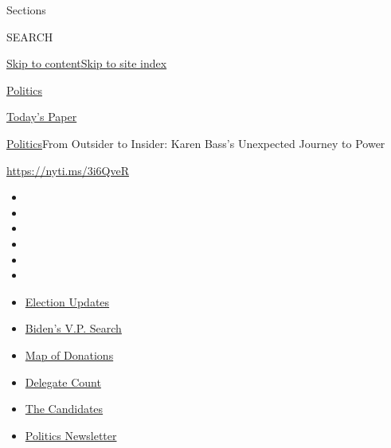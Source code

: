 Sections

SEARCH

\protect\hyperlink{site-content}{Skip to
content}\protect\hyperlink{site-index}{Skip to site index}

\href{https://www.nytimes3xbfgragh.onion/section/politics}{Politics}

\href{https://myaccount.nytimes3xbfgragh.onion/auth/login?response_type=cookie\&client_id=vi}{}

\href{https://www.nytimes3xbfgragh.onion/section/todayspaper}{Today's
Paper}

\href{/section/politics}{Politics}\textbar{}From Outsider to Insider:
Karen Bass's Unexpected Journey to Power

\url{https://nyti.ms/3i6QveR}

\begin{itemize}
\item
\item
\item
\item
\item
\item
\end{itemize}

\begin{itemize}
\item
  \href{https://www.nytimes3xbfgragh.onion/2020/08/04/us/elections/primary-election-michigan-arizona-kansas.html?action=click\&pgtype=Article\&state=default\&region=TOP_BANNER\&context=storylines_menu}{Election
  Updates}
\item
  \href{https://www.nytimes3xbfgragh.onion/article/biden-vice-president-2020.html?action=click\&pgtype=Article\&state=default\&region=TOP_BANNER\&context=storylines_menu}{Biden's
  V.P. Search}
\item
  \href{https://www.nytimes3xbfgragh.onion/interactive/2020/07/24/us/politics/trump-biden-campaign-donors.html?action=click\&pgtype=Article\&state=default\&region=TOP_BANNER\&context=storylines_menu}{Map
  of Donations}
\item
  \href{https://www.nytimes3xbfgragh.onion/interactive/2020/us/elections/delegate-count-primary-results.html?action=click\&pgtype=Article\&state=default\&region=TOP_BANNER\&context=storylines_menu}{Delegate
  Count}
\item
  \href{https://www.nytimes3xbfgragh.onion/interactive/2019/us/politics/2020-presidential-candidates.html?action=click\&pgtype=Article\&state=default\&region=TOP_BANNER\&context=storylines_menu}{The
  Candidates}
\item
  \href{https://www.nytimes3xbfgragh.onion/newsletters/politics?action=click\&pgtype=Article\&state=default\&region=TOP_BANNER\&context=storylines_menu}{Politics
  Newsletter}
\end{itemize}


